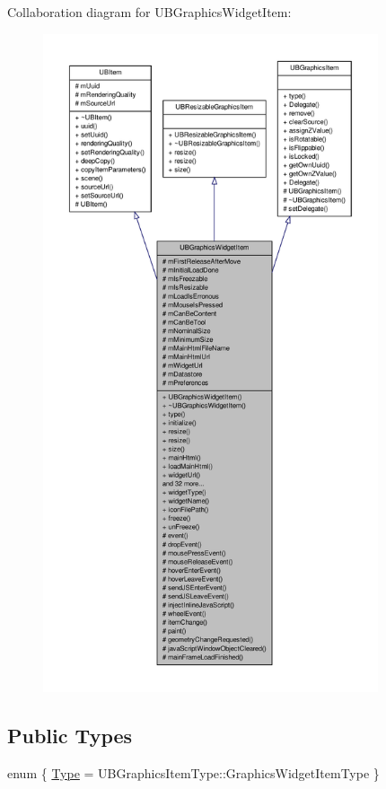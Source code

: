 Collaboration diagram for U\-B\-Graphics\-Widget\-Item\-:
\nopagebreak
\begin{figure}[H]
\begin{center}
\leavevmode
\includegraphics[height=550pt]{d1/db1/class_u_b_graphics_widget_item__coll__graph}
\end{center}
\end{figure}
\subsection*{Public Types}
\begin{DoxyCompactItemize}
\item 
enum \{ \hyperlink{class_u_b_graphics_widget_item_a87fa860d4a5f30733ad0a69b808376cda3246eda160045d14b903c6d2da6146b6}{Type} =  U\-B\-Graphics\-Item\-Type\-:\-:Graphics\-Widget\-Item\-Type
 \}
\end{DoxyCompactItemize}
